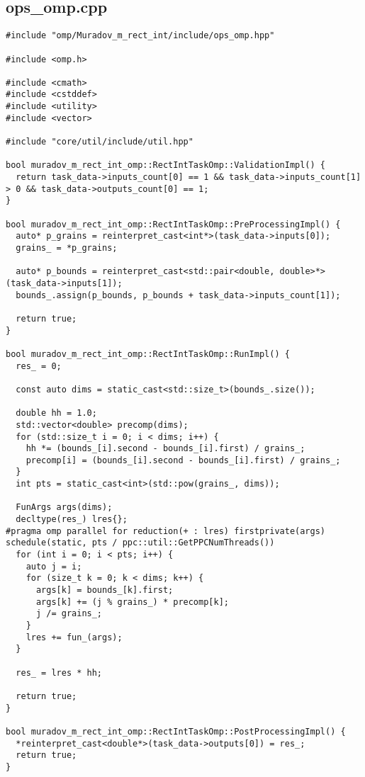 \documentclass[12pt,a4paper]{extarticle}
\begin{document}
\subsection{ops\_omp.cpp}
\begin{lstlisting}
#include "omp/Muradov_m_rect_int/include/ops_omp.hpp"

#include <omp.h>

#include <cmath>
#include <cstddef>
#include <utility>
#include <vector>

#include "core/util/include/util.hpp"

bool muradov_m_rect_int_omp::RectIntTaskOmp::ValidationImpl() {
  return task_data->inputs_count[0] == 1 && task_data->inputs_count[1] > 0 && task_data->outputs_count[0] == 1;
}

bool muradov_m_rect_int_omp::RectIntTaskOmp::PreProcessingImpl() {
  auto* p_grains = reinterpret_cast<int*>(task_data->inputs[0]);
  grains_ = *p_grains;

  auto* p_bounds = reinterpret_cast<std::pair<double, double>*>(task_data->inputs[1]);
  bounds_.assign(p_bounds, p_bounds + task_data->inputs_count[1]);

  return true;
}

bool muradov_m_rect_int_omp::RectIntTaskOmp::RunImpl() {
  res_ = 0;

  const auto dims = static_cast<std::size_t>(bounds_.size());

  double hh = 1.0;
  std::vector<double> precomp(dims);
  for (std::size_t i = 0; i < dims; i++) {
    hh *= (bounds_[i].second - bounds_[i].first) / grains_;
    precomp[i] = (bounds_[i].second - bounds_[i].first) / grains_;
  }
  int pts = static_cast<int>(std::pow(grains_, dims));

  FunArgs args(dims);
  decltype(res_) lres{};
#pragma omp parallel for reduction(+ : lres) firstprivate(args) schedule(static, pts / ppc::util::GetPPCNumThreads())
  for (int i = 0; i < pts; i++) {
    auto j = i;
    for (size_t k = 0; k < dims; k++) {
      args[k] = bounds_[k].first;
      args[k] += (j % grains_) * precomp[k];
      j /= grains_;
    }
    lres += fun_(args);
  }

  res_ = lres * hh;

  return true;
}

bool muradov_m_rect_int_omp::RectIntTaskOmp::PostProcessingImpl() {
  *reinterpret_cast<double*>(task_data->outputs[0]) = res_;
  return true;
}
\end{lstlisting}
\end{document}
